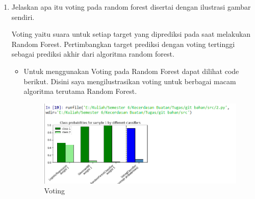 \begin{enumerate}
\item Jelaskan apa itu voting pada random forest disertai dengan ilustrasi gambar sendiri.\par
Voting yaitu suara untuk setiap target yang diprediksi pada saat melakukan Random Forest. Pertimbangkan target prediksi dengan voting tertinggi sebagai prediksi akhir dari algoritma random forest.
\begin{itemize}
\item
Untuk menggunakan Voting pada Random Forest dapat dilihat code berikut. Disini saya mengilustrasikan voting untuk berbagai macam algoritma terutama Random Forest.
\begin{figure}[ht]
\centering
\includegraphics[scale=0.5]{figures/1174012/3/2.PNG}
\caption{Voting}
\label{contoh}
\end{figure}
\end{itemize}
\end{enumerate}


